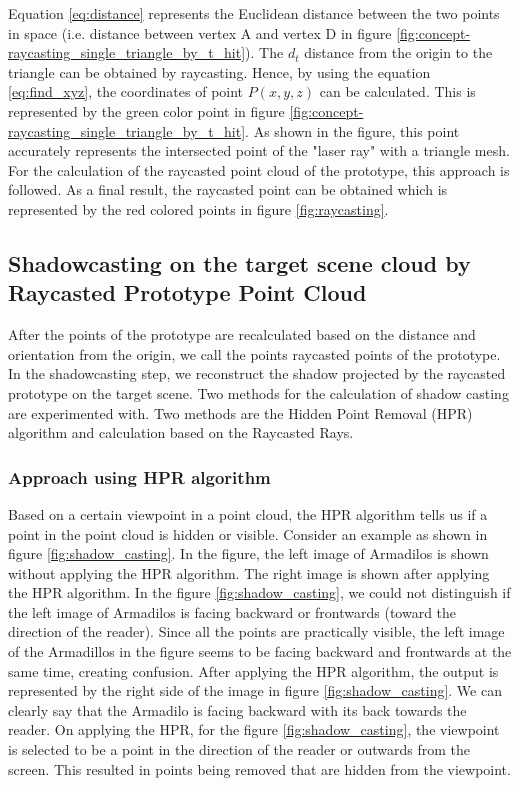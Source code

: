 Equation \ref{eq:distance} represents the Euclidean distance between the two points in space (i.e. distance between vertex A and vertex D in figure \ref{fig:concept-raycasting_single_triangle_by_t_hit}). The \(d_t\) distance from the origin to the triangle can be obtained by raycasting. Hence, by using the equation \ref{eq:find_xyz}, the coordinates of point \(P(x,y,z)\) can be calculated. This is represented by the green color point in figure \ref{fig:concept-raycasting_single_triangle_by_t_hit}. As shown in the figure, this point accurately represents the intersected point of the "laser ray" with a triangle mesh. For the calculation of the raycasted point cloud of the prototype, this approach is followed. As a final result, the raycasted point can be obtained which is represented by the red colored points in figure \ref{fig:raycasting}.

\subsection{Shadowcasting on the target scene cloud by Raycasted Prototype Point Cloud}

After the points of the prototype are recalculated based on the distance and orientation from the origin, we call the points raycasted points of the prototype. In the shadowcasting step, we reconstruct the shadow projected by the raycasted prototype on the target scene. Two methods for the calculation of shadow casting are experimented with. Two methods are the Hidden Point Removal (HPR) algorithm and calculation based on the Raycasted Rays.

\subsubsection{Approach using HPR algorithm}
Based on a certain viewpoint in a point cloud, the HPR algorithm tells us if a point in the point cloud is hidden or visible. Consider an example as shown in figure \ref{fig:shadow_casting}. In the figure, the left image of Armadilos is shown without applying the HPR algorithm. The right image is shown after applying the HPR algorithm. In the figure \ref{fig:shadow_casting}, we could not distinguish if the left image of Armadilos is facing backward or frontwards (toward the direction of the reader). Since all the points are practically visible, the left image of the Armadillos in the figure seems to be facing backward and frontwards at the same time, creating confusion. After applying the HPR algorithm, the output is represented by the right side of the image in figure \ref{fig:shadow_casting}. We can clearly say that the Armadilo is facing backward with its back towards the reader. On applying the HPR, for the figure \ref{fig:shadow_casting}, the viewpoint is selected to be a point in the direction of the reader or outwards from the screen. This resulted in points being removed that are hidden from the viewpoint.


